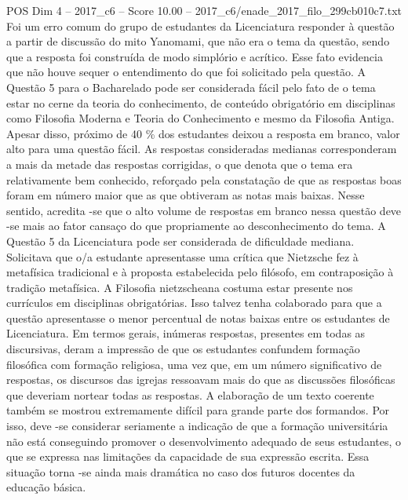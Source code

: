 \begin{textsample}{POS Dim 4 – 2017\_c6 – Score 10.00 – 2017\_c6/enade\_2017\_filo\_299cb010c7.txt}
Foi um erro comum do grupo de estudantes da Licenciatura responder à questão a partir de discussão do mito Yanomami, que não era o tema da questão, sendo que a resposta foi construída de modo simplório e acrítico.
Esse fato evidencia que não houve sequer o entendimento do que foi solicitado pela questão.
A Questão 5 para o Bacharelado pode ser considerada fácil pelo fato de o tema estar no cerne da teoria do conhecimento, de conteúdo obrigatório em disciplinas como Filosofia Moderna e Teoria do Conhecimento e mesmo da Filosofia Antiga.
Apesar disso, próximo de 40 \% dos estudantes deixou a resposta em branco, valor alto para uma questão fácil.
As respostas consideradas medianas corresponderam a mais da metade das respostas corrigidas, o que denota que o tema era relativamente bem conhecido, reforçado pela constatação de que as respostas boas foram em número maior que as que obtiveram as notas mais baixas.
Nesse sentido, acredita -se que o alto volume de respostas em branco nessa questão deve -se mais ao fator cansaço do que propriamente ao desconhecimento do tema.
A Questão 5 da Licenciatura pode ser considerada de dificuldade mediana.
Solicitava que o/a estudante apresentasse uma crítica que Nietzsche fez à metafísica tradicional e à proposta estabelecida pelo filósofo, em contraposição à tradição metafísica.
A Filosofia nietzscheana costuma estar presente nos currículos em disciplinas obrigatórias.
Isso talvez tenha colaborado para que a questão apresentasse o menor percentual de notas baixas entre os estudantes de Licenciatura.
Em termos gerais, inúmeras respostas, presentes em todas as discursivas, deram a impressão de que os estudantes confundem formação filosófica com formação religiosa, uma vez que, em um número significativo de respostas, os discursos das igrejas ressoavam mais do que as discussões filosóficas que deveriam nortear todas as respostas.
A elaboração de um texto coerente também se mostrou extremamente difícil para grande parte dos formandos.
Por isso, deve -se considerar seriamente a indicação de que a formação universitária não está conseguindo promover o desenvolvimento adequado de seus estudantes, o que se expressa nas limitações da capacidade de sua expressão escrita.
Essa situação torna -se ainda mais dramática no caso dos futuros docentes da educação básica.

\end{textsample}
